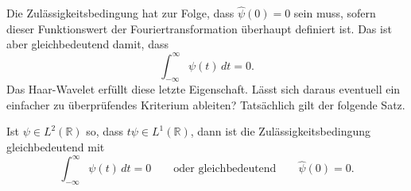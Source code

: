 Die Zulässigkeitsbedingung hat zur Folge, dass $\hat{\psi}(0)=0$ sein muss,
sofern dieser Funktionswert der Fouriertransformation überhaupt
definiert ist.
Das ist aber gleichbedeutend damit, dass 
\[
\int_{-\infty}^\infty \psi(t)\,dt = 0.
\]
Das Haar-Wavelet erfüllt diese letzte Eigenschaft.
Lässt sich daraus eventuell ein einfacher zu überprüfendes Kriterium
ableiten?
Tatsächlich gilt der folgende Satz.

\begin{satz}
\label{satz:zulaessigkeit}
Ist $\psi \in L^2(\mathbb R)$ so, dass $t\psi\in L^1(\mathbb R)$, dann
ist die Zulässigkeitsbedingung gleichbedeutend mit
\begin{equation}
\int_{-\infty}^\infty \psi(t)\,dt = 0
\qquad\text{oder gleichbedeutend}\qquad
\hat{\psi}(0)=0.
\label{gleichbedeutend}
\end{equation}
\end{satz}

